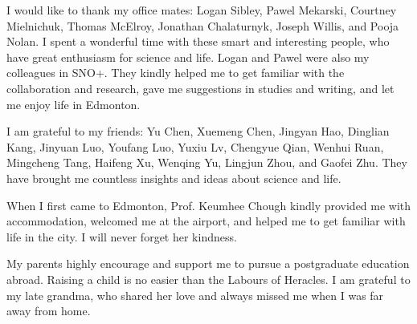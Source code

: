 I would like to thank my office mates: Logan Sibley, Pawel Mekarski, Courtney Mielnichuk, Thomas McElroy, Jonathan Chalaturnyk, Joseph Willis, and Pooja Nolan. I spent a wonderful time with these smart and interesting people, who have great enthusiasm for science and life. Logan and Pawel were also my colleagues in SNO+. They kindly helped me to get familiar with the collaboration and research, gave me suggestions in studies and writing, and let me enjoy life in Edmonton.

I am grateful to my friends: Yu Chen, Xuemeng Chen, Jingyan Hao, Dinglian Kang, Jinyuan Luo, Youfang Luo, Yuxiu Lv, Chengyue Qian, Wenhui Ruan, Mingcheng Tang, Haifeng Xu, Wenqing Yu, Lingjun Zhou, and Gaofei Zhu. They have brought me countless insights and ideas about science and life.

When I first came to Edmonton, Prof. Keumhee Chough kindly provided me with accommodation, welcomed me at the airport, and helped me to get familiar with life in the city. I will never forget her kindness.

My parents highly encourage and support me to pursue a postgraduate education abroad. Raising a child is no easier than the Labours of Heracles. I am grateful to my late grandma, who shared her love and always missed me when I was far away from home.
